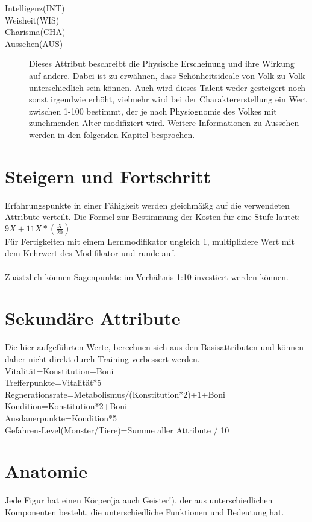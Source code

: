 \documentclass[a4paper,12pt,oneside]{book}
\begin{document}
\begin{description}
\item[Intelligenz(INT)]
\item[Weisheit(WIS)]
\item[Charisma(CHA)]
\item[Aussehen(AUS)]
Dieses Attribut beschreibt die Physische Erscheinung und ihre Wirkung auf andere. Dabei ist zu erwähnen, dass Schönheitsideale von Volk zu Volk unterschiedlich sein können. Auch wird dieses Talent weder gesteigert noch sonst irgendwie erhöht, vielmehr wird bei der Charaktererstellung ein Wert zwischen 1-100 bestimmt, der je nach Physiognomie des Volkes mit zunehmenden Alter modifiziert wird. Weitere Informationen zu Aussehen werden in den folgenden Kapitel besprochen.
\end{description}
\chapter{Steigern und Fortschritt}
Erfahrungspunkte in einer Fähigkeit werden gleichmäßig auf die verwendeten Attribute verteilt. Die Formel zur Bestimmung der Kosten für eine Stufe lautet:
\\$9X+11X*(\frac{X}{20})$
\\Für Fertigkeiten mit einem Lernmodifikator ungleich 1, multipliziere Wert mit dem Kehrwert des Modifikator und runde auf.
\\
\\Zuästzlich können Sagenpunkte im Verhältnis 1:10 investiert werden können.
\chapter{Sekundäre Attribute}
Die hier aufgeführten Werte, berechnen sich aus den Basisattributen und können daher nicht direkt durch Training verbessert werden.
\\Vitalität=Konstitution+Boni
\\Trefferpunkte=Vitalität*5
\\Regnerationsrate=Metabolismus/(Konstitution*2)+1+Boni
\\Kondition=Konstitution*2+Boni
\\Ausdauerpunkte=Kondition*5
\\Gefahren-Level(Monster/Tiere)=Summe aller Attribute / 10

\chapter{Anatomie}
Jede Figur hat einen Körper(ja auch Geister!), der aus unterschiedlichen Komponenten besteht, die unterschiedliche Funktionen und Bedeutung hat.
\end{document}
